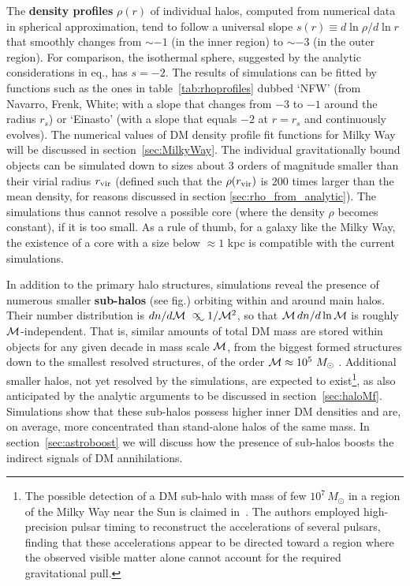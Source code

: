 \smallskip



\smallskip

The {\bf density profiles} $\rho(r)$ of individual halos, computed from numerical data in spherical approximation, 
tend to follow a universal slope $s(r) \equiv d\ln \rho/d\ln r $ that smoothly changes from $\sim -1$ (in the inner region) to $\sim -3$ (in the outer region).
For comparison, the isothermal sphere, suggested by the analytic considerations in eq., has $s=-2$. 
The results of simulations can be fitted by functions such as the ones in table~\ref{tab:rhoprofiles}
dubbed `NFW' (from Navarro, Frenk, White; with a slope that changes from $-3$ to $-1$ around the radius $r_s$)
 or `Einasto' (with a slope that equals $-2$ at $r=r_s$ and continuously evolves). 
The  numerical values of DM density profile fit functions for Milky Way will be discussed in section~\ref{sec:MilkyWay}.
The individual gravitationally bound objects can be simulated down to sizes about 3 orders of magnitude smaller than their
virial radius $r_{\rm vir}$
(defined such that the $\rho(r_{\rm vir})$ is 200 times  larger than the mean density,
for  reasons discussed in section \ref{sec:rho_from_analytic}).
The simulations thus cannot resolve a possible core (where the density $\rho$ becomes constant), if it is too small. 
As a rule of thumb, for a galaxy like the Milky Way, the existence of a core with a size below $\approx 1$ kpc 
is compatible with the current simulations. 

\smallskip

In addition to the primary halo structures, simulations reveal the presence of numerous smaller {\bf sub-halos} (see fig.)
orbiting within and around main halos. Their number distribution is $dn/d\Mcal  \approxprop 1/\Mcal ^2$, so that
${\mathcal{M}}\,  dn/d\ln {\mathcal{M}} $ is roughly ${\mathcal{M}} $-independent.
That is, similar amounts of total DM mass are stored within objects for any given decade in mass scale ${\mathcal{M}} $,
from the biggest formed structures down to the smallest resolved structures, of the order ${\mathcal{M}} \approx 10^5 \  M_\odot$ \cite{subhaloproperties}.
Additional smaller halos, not yet resolved by the simulations, are expected to exist\footnote{The possible detection of a DM sub-halo with mass of few $10^7\, M_\odot$ in a region of the Milky Way near the Sun is claimed in~\cite{2507.16932}. The authors employed high-precision pulsar timing to reconstruct the accelerations of several pulsars, finding that these accelerations appear to be directed toward a region 
where the observed visible matter alone cannot account for the required gravitational pull.}, as also anticipated by the analytic arguments to be discussed in section~\ref{sec:haloMf}.
Simulations show that these sub-halos possess higher inner DM densities and are, on average, more concentrated than stand-alone halos of the same mass.
In section~\ref{sec:astroboost} we will discuss how the presence of sub-halos boosts the indirect signals of DM annihilations.

